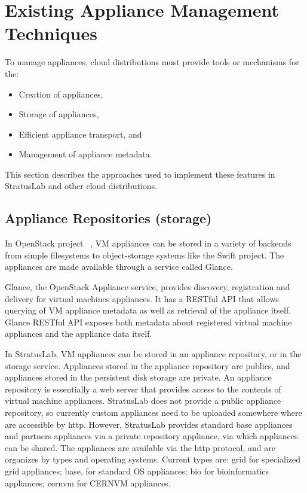 \section{Existing Appliance Management Techniques}
\label{sec:other-approaches}

To manage appliances, cloud distributions must provide tools or
mechanisms for the:
\begin{itemize}
\item Creation of appliances,
\item Storage of appliances,
\item Efficient appliance transport, and
\item Management of appliance metadata.
\end{itemize}
This section describes the approaches used to implement these features
in StratusLab and other cloud distributions.

\subsection{Appliance Repositories (storage)}

In OpenStack project ~\cite{openstack}, VM appliances can be stored in a variety of
backends from simple filesystems to object-storage systems like the
Swift project. The appliances are made available through a service
called Glance.

Glance, the OpenStack Appliance service, provides discovery,
registration and delivery for virtual machines appliances. It has a
RESTful API that allows querying of VM appliance metadata as well as
retrieval of the appliance itself.  Glance RESTful API exposes both
metadata about registered virtual machine appliances and the appliance
data itself.

In StratusLab, VM appliances can be stored in an appliance repository,
or in the storage service. Appliances stored in the appliance
repository are publics, and appliances stored in the persistent disk
storage are private.  An appliance repository is essentially a web
server that provides access to the contents of virtual machine
appliances. StratusLab does not provide a public appliance repository,
so currently custom appliances need to be uploaded somewhere where are
accessible by http. However, StratusLab provides standard base
appliances and partners appliances via a private repository appliance,
via which appliances can be shared. The appliances are available via
the http protocol, and are organizes by types and operating systems.
Current types are: grid for specialized grid appliances; base, for
standard OS appliances; bio for bioinformatics appliances; cernvm for
CERNVM appliances.

